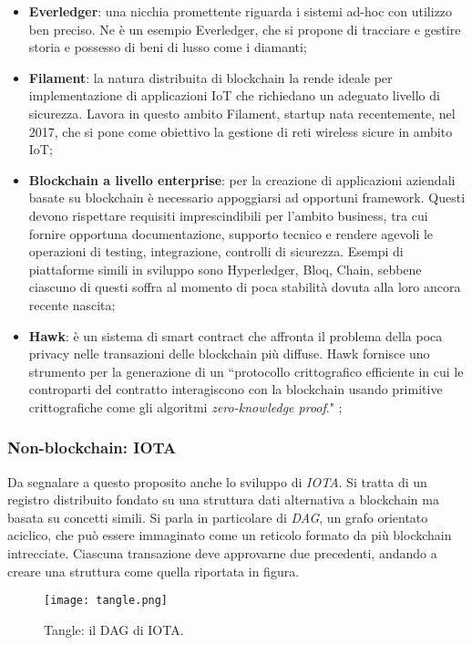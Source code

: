 \begin{itemize}
            \item \textbf{Everledger}: una nicchia promettente riguarda i sistemi ad-hoc con utilizzo ben preciso. Ne è un esempio Everledger, che si propone di tracciare e gestire storia e possesso di beni di lusso come i diamanti;

            \item \textbf{Filament}: la natura distribuita di blockchain la rende ideale per implementazione di applicazioni IoT che richiedano un adeguato livello di sicurezza. Lavora in questo ambito Filament, startup nata recentemente, nel 2017, che si pone come obiettivo la gestione di reti wireless sicure in ambito IoT;

            \item \textbf{Blockchain a livello enterprise}: per la creazione di applicazioni aziendali basate su blockchain è necessario appoggiarsi ad opportuni framework. Questi devono rispettare requisiti imprescindibili per l'ambito business, tra cui fornire opportuna documentazione, supporto tecnico e rendere agevoli le operazioni di testing, integrazione, controlli di sicurezza. Esempi di piattaforme simili in sviluppo sono Hyperledger, Bloq, Chain, sebbene ciascuno di questi soffra al momento di poca stabilità dovuta alla loro ancora recente nascita;
            
            \item \textbf{Hawk}: è un sistema di smart contract che affronta il problema della poca privacy nelle transazioni delle blockchain più diffuse. Hawk fornisce uno strumento per la generazione di un ``protocollo crittografico efficiente in cui le controparti del contratto interagiscono con la blockchain usando primitive crittografiche come gli algoritmi \emph{zero-knowledge proof}." \cite{hawk};
        \end{itemize}
        \subsubsection{Non-blockchain: IOTA}
            Da segnalare a questo proposito anche lo sviluppo di \emph{IOTA}. Si tratta di un registro distribuito fondato su una struttura dati alternativa a blockchain ma basata su concetti simili. Si parla in particolare di \emph{DAG}, un grafo orientato aciclico, che può essere immaginato come un reticolo formato da più blockchain intrecciate. Ciascuna transazione deve approvarne due precedenti, andando a creare una struttura come quella riportata in figura.
            \begin{figure}[ht]
                \centering
                \texttt{[image: tangle.png]}
                \caption[Tangle: il DAG di IOTA]{Tangle: il DAG di IOTA.}
                \label{fig:ethereum-load}
            \end{figure}

